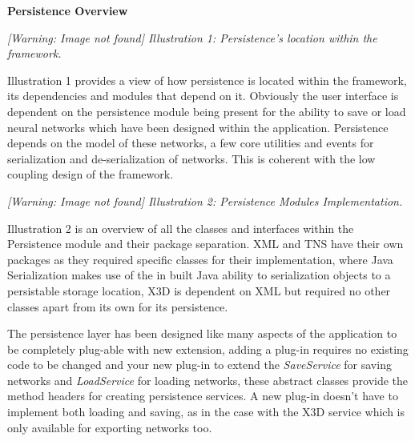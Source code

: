 \documentclass[12pt,twoside]{article}
\begin{document}
{\bfseries
Persistence Overview}

{\mdseries
}

\begin{center}
\begin{minipage}{10cm}
{\raggedleft\itshape
 [Warning: Image not found] Illustration 1:
Persistence's location within the framework.
\par}
\end{minipage}\end{center}
{\mdseries
Illustration 1 provides a view of how persistence is located within the
framework, its dependencies and modules that depend on it. Obviously
the user interface is dependent on the persistence module being present
for the ability to save or load neural networks which have been
designed within the application. Persistence depends on the model of
these networks, a few core utilities and events for serialization and
de{}-serialization of networks. This is coherent with the low coupling
design of the framework.}


\bigskip

{\mdseries
}

\begin{center}
\begin{minipage}{17cm}
{\raggedleft\itshape
 [Warning: Image not found] Illustration 2: Persistence Modules
Implementation.
\par}
\end{minipage}\end{center}
{\mdseries
Illustration 2 is an overview of all the classes and interfaces within
the Persistence module and their package separation. XML and TNS have
their own packages as they required specific classes for their
implementation, where Java Serialization makes use of the in built Java
ability to serialization objects to a persistable storage location, X3D
is dependent on XML but required no other classes apart from its own
for its persistence.}


{\mdseries
The persistence layer has been designed like many aspects of the
application to be completely plug{}-able with new extension, adding a
plug{}-in requires no existing code to be changed and your new
plug{}-in to extend the \textit{SaveService}\textup{ for saving
networks and }\textit{LoadService}\textup{ for loading networks, these
abstract classes provide the method headers for creating persistence
services. A new plug{}-in doesn't have to implement
both loading and saving, as in the case with the X3D service which is
only available for exporting networks too.}}
\end{document}
